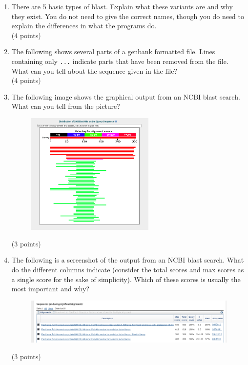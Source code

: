 \documentclass[11pt]{article}
\begin{document}
\begin{enumerate}
{  \texttt{S2}.
}\\
(5 points)
\item There are 5 basic types of blast. Explain what these variants are and
  why they exist. You do not need to give the correct names, though you do
  need to explain the differences in what the programs do.\\
  (4 points)
\item The following shows several parts of a genbank formatted file. Lines
  containing only \texttt{...} indicate parts that have been removed from the
  file. What can you tell about the sequence given in the file?
  {\tiny }\\
  (4 points)
\item The following image shows the graphical output from an NCBI blast
  search. What can you tell from the picture?
  \begin{figure}[H]
  \includegraphics[width=0.6\textwidth]{images/blast_result_image}
  \end{figure}
  (3 points)
\item The following is a screenshot of the output from an NCBI blast
  search. What do the different columns indicate (consider the total scores
  and max scores as a single score for the sake of simplicity). Which of these
  scores is usually the most important and why?
  \begin{figure}[H]
    \includegraphics[width=\textwidth]{images/blast_result_list_top}
  \end{figure}
  (3 points)
\end{enumerate}
\end{document}
